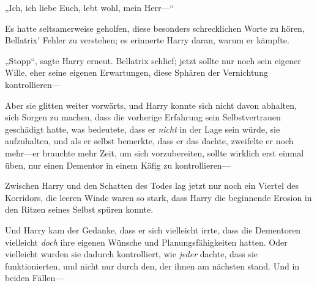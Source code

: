 „Ich, ich liebe Euch, lebt wohl, mein Herr—“


Es hatte seltsamerweise geholfen, diese besonders schrecklichen Worte zu hören, Bellatrix' Fehler zu verstehen; es erinnerte Harry daran, warum er kämpfte.

„Stopp“, sagte Harry erneut. Bellatrix schlief; jetzt sollte nur noch sein eigener Wille, eher seine eigenen Erwartungen, diese Sphären der Vernichtung kontrollieren—

Aber sie glitten weiter vorwärts, und Harry konnte sich nicht davon abhalten, sich Sorgen zu machen, dass die vorherige Erfahrung sein Selbstvertrauen geschädigt hatte, was bedeutete, dass er \emph{nicht} in der Lage sein würde, sie aufzuhalten, und als er selbst bemerkte, dass er das dachte, zweifelte er noch mehr—er brauchte mehr Zeit, um sich vorzubereiten, sollte wirklich erst einmal üben, nur einen Dementor in einem Käfig zu kontrollieren—

Zwischen Harry und den Schatten des Todes lag jetzt nur noch ein Viertel des Korridors, die leeren Winde waren so stark, dass Harry die beginnende Erosion in den Ritzen seines Selbst spüren konnte.

Und Harry kam der Gedanke, dass er sich vielleicht irrte, dass die Dementoren vielleicht \emph{doch} ihre eigenen Wünsche und Planungsfähigkeiten hatten. Oder vielleicht wurden sie dadurch kontrolliert, wie \emph{jeder} dachte, dass sie funktionierten, und nicht nur durch den, der ihnen am nächsten stand. Und in beiden Fällen—

